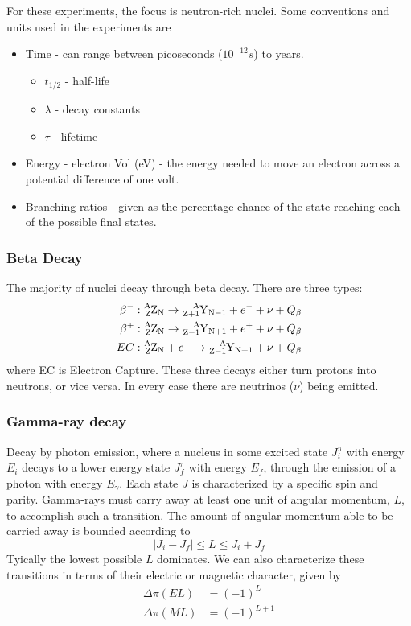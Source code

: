 For these experiments, the focus is neutron-rich nuclei. Some conventions and units
used in the experiments are
\begin{itemize}
	\item Time - can range between picoseconds ($10^{-12}s$) to years.
	\begin{itemize}
		\item $t_{1/2}$ - half-life
		\item $\lambda$ - decay constants
		\item $\tau$ - lifetime
	\end{itemize}
	\item Energy - electron Vol (eV) - the energy needed to move an electron
	across a potential difference of one volt.
	\item Branching ratios - given as the percentage chance of the state reaching
	each of the possible final states.
\end{itemize}
\subsubsection{Beta Decay}
The majority of nuclei decay through beta decay. There are three types:
\begin{align}
	\beta^-: \ce{^{A}_{Z}Z_{N}} \rightarrow \ce{^{A}_{Z+1}Y_{N-1}} + e^- + \nu + Q_{\beta} \\
	\beta^+: \ce{^{A}_{Z}Z_{N}} \rightarrow \ce{^{A}_{Z-1}Y_{N+1}} + e^+ + \nu + Q_{\beta} \\
	EC: \ce{^{A}_{Z}Z_{N}} + e^- \rightarrow \ce{^{A}_{Z-1}Y_{N+1}} + \bar{\nu} + Q_{\beta}
\end{align}
where EC is Electron Capture. These three decays either turn protons into neutrons, or
vice versa. In every case there are neutrinos ($\nu$) being emitted.

\subsubsection{Gamma-ray decay}
Decay by photon emission, where a nucleus in some excited state $J_i^{\pi}$ with energy
$E_i$ decays to a lower energy state $J_f^{\pi}$ with energy $E_f$, through the emission
of a photon with energy $E_{\gamma}$. Each state $J$ is characterized by a specific spin
and parity. Gamma-rays must carry away at least one unit of angular momentum, $L$, to
accomplish such a transition. The amount of angular momentum able to be carried away is
bounded according to
\begin{equation}
	|J_i - J_f| \leq L \leq J_i + J_f
\end{equation}
Tyically the lowest possible $L$ dominates. We can also characterize these transitions
in terms of their electric or magnetic character, given by
\begin{align}
	\Delta\pi(EL) &= (-1)^L \\
	\Delta\pi(ML) &= (-1)^{L+1}
\end{align}

